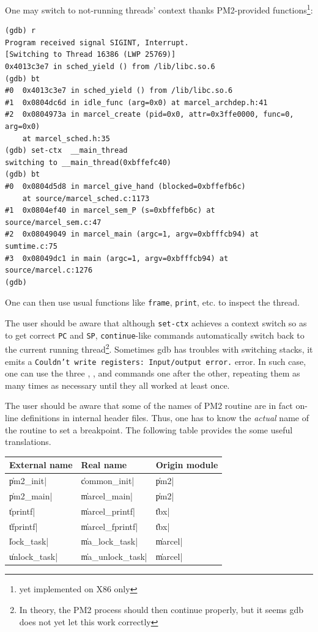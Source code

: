One may switch to not-running threads' context thanks PM2-provided
functions\footnote{yet implemented on X86 only}:

\begin{verbatim}
(gdb) r
Program received signal SIGINT, Interrupt.
[Switching to Thread 16386 (LWP 25769)]
0x4013c3e7 in sched_yield () from /lib/libc.so.6
(gdb) bt
#0  0x4013c3e7 in sched_yield () from /lib/libc.so.6
#1  0x0804dc6d in idle_func (arg=0x0) at marcel_archdep.h:41
#2  0x0804973a in marcel_create (pid=0x0, attr=0x3ffe0000, func=0, arg=0x0)
    at marcel_sched.h:35
(gdb) set-ctx  __main_thread
switching to __main_thread(0xbffefc40)
(gdb) bt
#0  0x0804d5d8 in marcel_give_hand (blocked=0xbffefb6c)
    at source/marcel_sched.c:1173
#1  0x0804ef40 in marcel_sem_P (s=0xbffefb6c) at source/marcel_sem.c:47
#2  0x08049049 in marcel_main (argc=1, argv=0xbfffcb94) at sumtime.c:75
#3  0x08049dc1 in main (argc=1, argv=0xbfffcb94) at source/marcel.c:1276
(gdb)
\end{verbatim}

One can then use usual functions like \texttt{frame}, \texttt{print},
etc. to inspect the thread.

The user should be aware that although \texttt{set-ctx} achieves a
context switch so as to get correct \texttt{PC} and \texttt{SP},
\texttt{continue}-like commands automatically switch back to the
current running thread\footnote{In theory, the PM2 process should
then continue properly, but it seems gdb does not yet let this work
correctly}. Sometimes gdb has troubles with switching stacks, it emits
a \texttt{Couldn't write registers: Input/output error.} error. In such
case, one can use the three , , and
 commands one after the other, repeating them as many
times as necessary until they all worked at least once.

The user should be aware that some of the names of PM2 routine are in
fact on-line definitions in internal header files. Thus, one has to
know the \emph{actual} name of the routine to set a breakpoint. The
following table provides the some useful translations.
\begin{center}
\begin{tabular}{|l|l|l|}
\hline
External name & Real name & Origin module \\
\hline
\|pm2_init|     & \|common_init|        & \|pm2| \\
\|pm2_main|     & \|marcel_main|        & \|pm2| \\
\hline
\|tprintf|      & \|marcel_printf|      & \|tbx| \\
\|tfprintf|     & \|marcel_fprintf|     & \|tbx| \\
\hline
\|lock_task|    & \|ma_lock_task|       & \|marcel| \\
\|unlock_task|  & \|ma_unlock_task|     & \|marcel| \\
\hline
\end{tabular}
\end{center}


